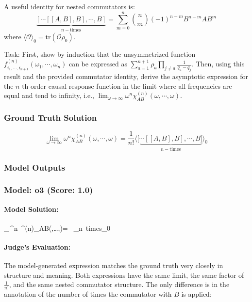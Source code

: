 \documentclass[10pt]{article}
\begin{document}
A useful identity for nested commutators is:
$$ \underbrace{[\cdots[[A,B],B],\cdots,B]}_{n-\mathrm{times}}=\sum_{m=0}^n{n\choose m}(-1)^{n-m}B^{n-m}AB^m $$
where $\langle \mathcal{O} \rangle_0 = \mathrm{tr}(\mathcal{O}\rho_0)$.

Task:
First, show by induction that the unsymmetrized function $f^{(n)}_{i_1,\cdots,i_{n+1}}(\omega_1,\cdots,\omega_n)$ can be expressed as $\sum_{a=1}^{n+1}\rho_a\prod_{j\neq a}\frac{1}{q_a-q_j}$. Then, using this result and the provided commutator identity, derive the asymptotic expression for the $n$-th order causal response function in the limit where all frequencies are equal and tend to infinity, i.e., $\lim_{\omega\rightarrow\infty}\omega^n\chi^{(n)}_{AB}(\omega,\cdots,\omega)$.

\subsubsection*{Ground Truth Solution}
\[ \boxed{\lim_{\omega\rightarrow\infty}\omega^n\chi^{(n)}_{AB}(\omega,\cdots,\omega)=\frac{1}{n!}\langle[\underbrace{\cdots[[A,B],B],\cdots,B]}_{n-\mathrm{times}}\rangle_0} \]

\subsubsection*{Model Outputs}
\subsubsection*{Model: o3 (Score: 1.0)}
\paragraph*{Model Solution:}
%
\displaystyle
\lim_{\omega\rightarrow\infty}\,\omega^{n}\,
\chi^{(n)}_{AB}(\omega,\dots ,\omega)=
\,
\left\langle{}_{n\ {\rm times}}\right\rangle_{0}

\paragraph*{Judge's Evaluation:}

The model-generated expression matches the ground truth very closely in structure and meaning. Both expressions have the same limit, the same factor of \( \frac{1}{n!} \), and the same nested commutator structure. The only difference is in the annotation of the number of times the commutator with \( B \) is applied:
\end{document}
